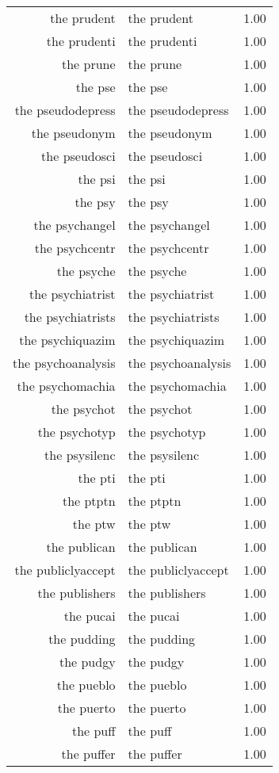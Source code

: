 \begin{table}[ht]
\begin{tabular}{rlr}
  the prudent & the prudent & 1.00 \\ 
  the prudenti & the prudenti & 1.00 \\ 
  the prune & the prune & 1.00 \\ 
  the pse & the pse & 1.00 \\ 
  the pseudodepress & the pseudodepress & 1.00 \\ 
  the pseudonym & the pseudonym & 1.00 \\ 
  the pseudosci & the pseudosci & 1.00 \\ 
  the psi & the psi & 1.00 \\ 
  the psy & the psy & 1.00 \\ 
  the psychangel & the psychangel & 1.00 \\ 
  the psychcentr & the psychcentr & 1.00 \\ 
  the psyche & the psyche & 1.00 \\ 
  the psychiatrist & the psychiatrist & 1.00 \\ 
  the psychiatrists & the psychiatrists & 1.00 \\ 
  the psychiquazim & the psychiquazim & 1.00 \\ 
  the psychoanalysis & the psychoanalysis & 1.00 \\ 
  the psychomachia & the psychomachia & 1.00 \\ 
  the psychot & the psychot & 1.00 \\ 
  the psychotyp & the psychotyp & 1.00 \\ 
  the psysilenc & the psysilenc & 1.00 \\ 
  the pti & the pti & 1.00 \\ 
  the ptptn & the ptptn & 1.00 \\ 
  the ptw & the ptw & 1.00 \\ 
  the publican & the publican & 1.00 \\ 
  the publiclyaccept & the publiclyaccept & 1.00 \\ 
  the publishers & the publishers & 1.00 \\ 
  the pucai & the pucai & 1.00 \\ 
  the pudding & the pudding & 1.00 \\ 
  the pudgy & the pudgy & 1.00 \\ 
  the pueblo & the pueblo & 1.00 \\ 
  the puerto & the puerto & 1.00 \\ 
  the puff & the puff & 1.00 \\ 
  the puffer & the puffer & 1.00 \\ 

\end{tabular}
\end{table}
